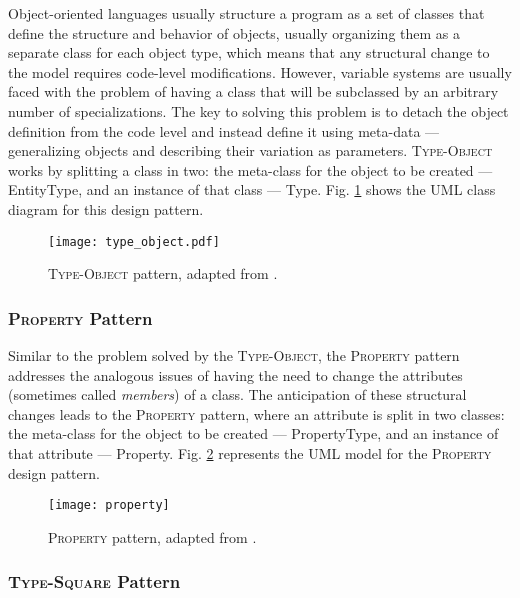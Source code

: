 Object-oriented languages usually structure a program as a set of classes that define the structure and behavior of objects, usually organizing them as a separate class for each object type, which means that any structural change to the model requires code-level modifications. However, variable systems are usually faced with the problem of having a class that will be subclassed by an arbitrary number of specializations. The key to solving this problem is to detach the object definition from the code level and instead define it using meta-data --- generalizing objects and describing their variation as parameters. \textsc{Type-Object} works by splitting a class in two\cite{YBJ01}: the meta-class for the object to be created --- EntityType, and an instance of that class --- Type. Fig. \ref{fig:type-object_pattern} shows the UML class diagram for this design pattern.

\begin{figure}[H]
  \centering
  \texttt{[image: type\_object.pdf]}
  \caption[\textsc{Type-Object} pattern]{\textsc{Type-Object} pattern, adapted from \cite{metadata_and_active_object_models}.}
  \label{fig:type-object_pattern}
\end{figure}

\subsubsection{\textsc{Property} Pattern}\label{sec:property_pattern}

Similar to the problem solved by the \textsc{Type-Object}, the \textsc{Property} pattern addresses the analogous issues of having the need to change the attributes (sometimes called \emph{members}) of a class. The anticipation of these structural changes leads to the \textsc{Property} pattern, where an attribute is split in two classes: the meta-class for the object to be created --- PropertyType, and an instance of that attribute --- Property. Fig. \ref{fig:property_pattern} represents the UML model for the \textsc{Property} design pattern.

\begin{figure}[H]
  \centering
  \texttt{[image: property]}
  \caption[\textsc{Property} pattern]{\textsc{Property} pattern, adapted from \cite{metadata_and_active_object_models}.}
  \label{fig:property_pattern}
\end{figure}

\subsubsection{\textsc{Type-Square} Pattern}\label{sec:type-square_pattern}

